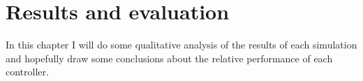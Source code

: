 \chapter{Results and evaluation}
\label{ch:evaluation}


In this chapter I will do some qualitative analysis of the results of each simulation and hopefully draw some conclusions about the relative performance of each controller.
